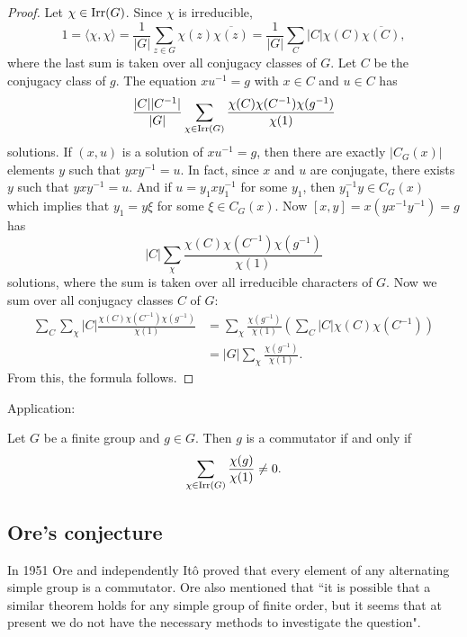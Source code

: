 \begin{proof}
    Let $\chi\in\operatorname{Irr}(G)$. Since $\chi$ is irreducible, 
    \[
    1=\langle\chi,\chi\rangle
    =\frac{1}{|G|}\sum_{z\in G}\chi(z)\overline{\chi(z)}
    =\frac{1}{|G|}\sum_{C}|C|\chi(C)\overline{\chi(C)},
    \]
    where the last sum is taken over all conjugacy classes of $G$. 
    Let $C$ be the conjugacy class of $g$. The equation
    $xu^{-1}=g$ with $x\in C$ and $u\in C$ has 
    \[
        \frac{|C||C^{-1}|}{|G|}\sum_{\chi\in\operatorname{Irr}(G)}\frac{\chi(C)\chi(C^{-1})\chi(g^{-1})}{\chi(1)}
    \]
    solutions. If $(x,u)$ is a solution of $xu^{-1}=g$, then
    there are exactly $|C_G(x)|$ elements $y$ such that $yxy^{-1}=u$. In fact, since $x$ and $u$ are conjugate, there exists $y$ such that $yxy^{-1}=u$. And if $u=y_1xy_1^{-1}$ for some $y_1$, then 
    $y_1^{-1}y\in C_G(x)$ which implies that $y_1=y\xi$ for some $\xi\in C_G(x)$. Now 
    $[x,y]=x(yx^{-1}y^{-1})=g$ has 
    \[
    |C|\sum_{\chi}\frac{\chi(C)\chi(C^{-1})\chi(g^{-1})}{\chi(1)}
    \]
    solutions, where the sum is taken over all irreducible characters of $G$. 
    Now we sum over all conjugacy classes $C$ of $G$:
    \begin{align*}
        \sum_{C}\sum_{\chi}|C|\frac{\chi(C)\chi(C^{-1})\chi(g^{-1})}{\chi(1)}
        &=\sum_{\chi}\frac{\chi(g^{-1})}{\chi(1)}\left(\sum_C|C|\chi(C)\chi(C^{-1})\right)\\
        &=|G|\sum_{\chi}\frac{\chi(g^{-1})}{\chi(1)}.
    \end{align*}
    From this, the formula follows. 
\end{proof}

Application:

\begin{corollary}
    Let $G$ be a finite group and $g\in G$. Then $g$ 
    is a commutator if and only if 
    \[
    \sum_{\chi\in\operatorname{Irr}(G)}\frac{\chi(g)}{\chi(1)}\ne0.
    \]
\end{corollary}

\subsection{Ore's conjecture}
\label{Ore}

In 1951 Ore and independently It\^o
proved that every element of any alternating simple group is a commutator. 
Ore also mentioned that ``it is possible that a similar theorem holds for any simple group of finite order, but it seems that at present we do not have the necessary methods to investigate the question". 

